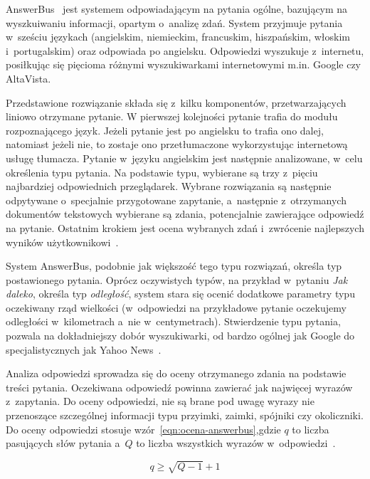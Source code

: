 
AnswerBus~\cite{zheng2002answerbus} jest systemem odpowiadającym na pytania ogólne, bazującym na wyszkuiwaniu informacji, opartym o~analizę zdań. System przyjmuje pytania w~sześciu językach (angielskim, niemieckim, francuskim, hiszpańskim, włoskim i~portugalskim) oraz odpowiada po angielsku. Odpowiedzi wyszukuje z~internetu, posiłkując się pięcioma różnymi wyszukiwarkami internetowymi m.in. Google czy AltaVista.

Przedstawione rozwiązanie składa się z~kilku komponentów, przetwarzających liniowo otrzymane pytanie. W pierwszej kolejności pytanie trafia do modułu rozpoznającego język. Jeżeli pytanie jest po angielsku to trafia ono dalej, natomiast jeżeli nie, to zostaje ono przetłumaczone wykorzystując internetową usługę tłumacza. Pytanie w~języku angielskim jest następnie analizowane, w~celu określenia typu pytania. Na podstawie typu, wybierane są trzy z~pięciu najbardziej odpowiednich przeglądarek. Wybrane rozwiązania są następnie odpytywane o~specjalnie przygotowane zapytanie, a~następnie z~otrzymanych dokumentów tekstowych wybierane są zdania, potencjalnie zawierające odpowiedź na pytanie. Ostatnim krokiem jest ocena wybranych zdań i~zwrócenie najlepszych wyników użytkownikowi~\cite{zheng2002answerbus}.  

System AnswerBus, podobnie jak większość tego typu rozwiązań, określa typ postawionego pytania. Oprócz oczywistych typów, na przykład w~pytaniu \emph{Jak daleko}, określa typ \emph{odległość}, system stara się ocenić dodatkowe parametry typu oczekiwany rząd wielkości (w~odpowiedzi na przykładowe pytanie oczekujemy odległości w~kilometrach a~nie w~centymetrach). Stwierdzenie typu pytania, pozwala na dokładniejszy dobór wyszukiwarki, od bardzo ogólnej jak Google do specjalistycznych jak Yahoo News~\cite{zheng2002answerbus}.

Analiza odpowiedzi sprowadza się do oceny otrzymanego zdania na podstawie treści pytania. Oczekiwana odpowiedź powinna zawierać jak najwięcej wyrazów z~zapytania. Do oceny odpowiedzi, nie są brane pod uwagę wyrazy nie przenoszące szczególnej informacji typu przyimki, zaimki, spójniki czy okoliczniki. Do oceny odpowiedzi stosuje wzór~\ref{eqn:ocena-answerbus},gdzie $q$ to liczba pasujących słów pytania a~$Q$ to liczba wszystkich wyrazów w~odpowiedzi~\cite{zheng2002answerbus}.

\begin{equation}
    \label{eqn:ocena-answerbus}
    q \geq  \sqrt{Q - 1}  + 1
\end{equation}

